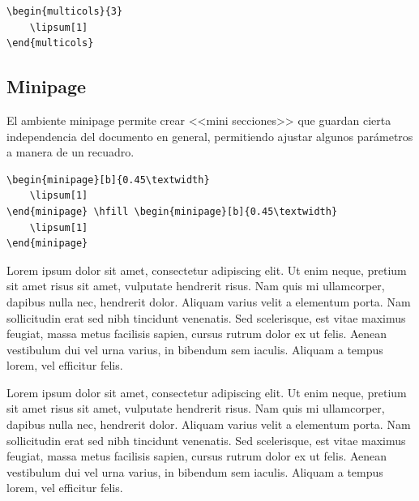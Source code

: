 \documentclass[a4,10pt]{aleph-notas}
\begin{document}
\begin{lstlisting}[frame=single]
\begin{multicols}{3}
    \lipsum[1]
\end{multicols}
\end{lstlisting}

\begin{center}
{ \fboxsep 12pt
 }
\end{center}

\subsection{Minipage}

El ambiente minipage permite crear <<mini secciones>> que guardan cierta independencia del documento en general, permitiendo ajustar algunos parámetros a manera de un recuadro.

\begin{lstlisting}[frame=single]
\begin{minipage}[b]{0.45\textwidth}
    \lipsum[1]
\end{minipage} \hfill \begin{minipage}[b]{0.45\textwidth}
    \lipsum[1]
\end{minipage}
\end{lstlisting}

\bigskip
\bigskip

\begin{minipage}[b]{0.45\textwidth}
Lorem ipsum dolor sit amet, consectetur adipiscing elit. Ut enim neque, pretium sit amet risus sit amet, vulputate hendrerit risus. Nam quis mi ullamcorper, dapibus nulla nec, hendrerit dolor. Aliquam varius velit a elementum porta. Nam sollicitudin erat sed nibh tincidunt venenatis. Sed scelerisque, est vitae maximus feugiat, massa metus facilisis sapien, cursus rutrum dolor ex ut felis. Aenean vestibulum dui vel urna varius, in bibendum sem iaculis. Aliquam a tempus lorem, vel efficitur felis. 
\end{minipage} \hfill \begin{minipage}[b]{0.45\textwidth}
Lorem ipsum dolor sit amet, consectetur adipiscing elit. Ut enim neque, pretium sit amet risus sit amet, vulputate hendrerit risus. Nam quis mi ullamcorper, dapibus nulla nec, hendrerit dolor. Aliquam varius velit a elementum porta. Nam sollicitudin erat sed nibh tincidunt venenatis. Sed scelerisque, est vitae maximus feugiat, massa metus facilisis sapien, cursus rutrum dolor ex ut felis. Aenean vestibulum dui vel urna varius, in bibendum sem iaculis. Aliquam a tempus lorem, vel efficitur felis. 
\end{minipage}
\end{document}

